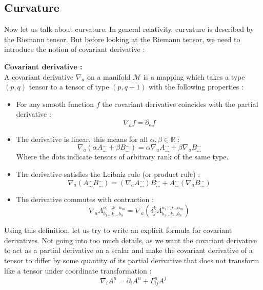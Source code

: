 \documentclass[a4paper,12pt]{article}
\theoremstyle{definition}
\begin{document}
\subsection{Curvature}
Now let us talk about curvature. In general relativity, curvature is described by the Riemann tensor.
But before looking at the Riemann tensor, we need to introduce the notion of covariant derivative :
\begin{definition}
	\textbf{Covariant derivative :}\\
	A covariant derivative $\nabla_a$ on a manifold $\mathcal{M}$ is a mapping which takes a type $(p,q)$ tensor to a tensor of type $(p,q+1)$ with the following properties :
	\begin{itemize}
		\item For any smooth function $f$ the covariant derivative coincides with the partial derivative :
		\begin{equation}
			\nabla_af=\partial_af
		\end{equation}
		\item The derivative is linear, this means for all $\alpha,\beta \in \mathbb{R}$ :
		\begin{equation}
			\nabla_a(\alpha A^{...}_{...}+\beta B^{...}_{...})=\alpha \nabla_a A^{...}_{...}+\beta\nabla_a B^{...}_{...}
		\end{equation}
		Where the dots indicate tensors of arbitrary rank of the same type.
		\item The derivative satisfies the Leibniz rule (or product rule) :
		\begin{equation}
			\nabla_a(A^{...}_{...}B^{...}_{...})=(\nabla_aA^{...}_{...})B^{...}_{...}+A^{...}_{...}(\nabla_aB^{...}_{...})
		\end{equation}
		\item The derivative commutes with contraction :
		\begin{equation}
			\nabla_aA^{a_1...k...a_m}_{b_1...k...b_n}=\nabla_a(\delta^k_jA^{a_1...j...a_m}_{b_1...k...b_n})
		\end{equation}
	\end{itemize}
\end{definition}
Using this definition, let us try to write an explicit formula for covariant derivatives.
Not going into too much details, as we want the covariant derivative to act as a partial derivative on a scalar and make the covariant derivative of a tensor to differ by some quantity of its partial derivative that does not transform like a tensor under coordinate transformation :
\begin{equation}
	\nabla_iA^n=\partial_iA^n+\Gamma^n_{ij}A^j
\end{equation}
\end{document}
